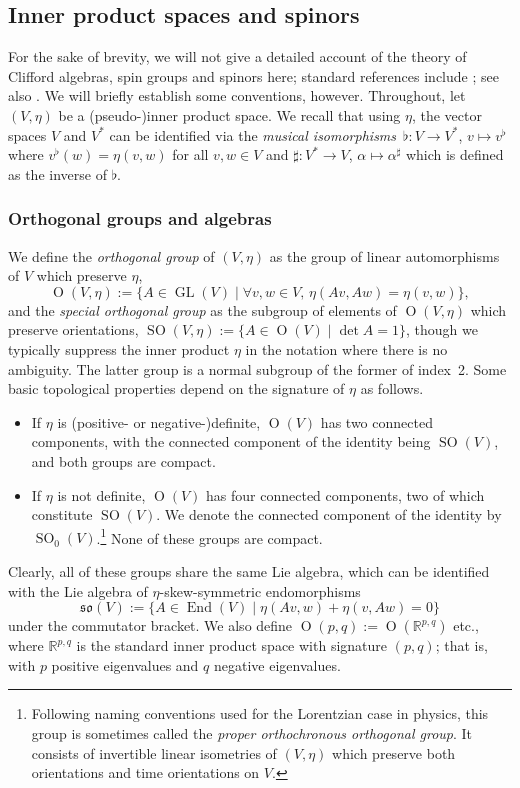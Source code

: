 \documentclass[pdftex]{sigma}
\numberwithin{equation}{section}
\newcommand{\fso}{\mathfrak{so}}
\newcommand{\RR}{\mathbb{R}}
\newcommand{\1}{\mathbbm{1}}
\DeclareMathOperator{\End}{End}
\DeclareMathOperator{\GL}{GL}
\DeclareMathOperator{\Orth}{O}
\DeclareMathOperator{\SO}{SO}
\begin{document}
\subsection{Inner product spaces and spinors}
\label{sec:inner-products-spinors}

For the sake of brevity, we will not give a detailed account of the theory of Clifford algebras, spin groups and spinors here; standard references include \cite{Harvey1990,Lawson1989}; see also \cite{JMF-spin}. We will briefly establish some conventions, however. Throughout, let $(V,\eta)$ be a (pseudo-)inner product space.
We recall that using $\eta$, the vector spaces $V$ and $V^*$ can be identified via the \emph{musical isomorphisms}~${\flat\colon V\to V^*}$, $v\mapsto v^\flat$ where
$v^\flat(w) = \eta(v,w)
$
for all $v,w\in V$ and $\sharp\colon V^*\to V$, $\alpha\mapsto\alpha^\sharp$ which is defined as the inverse of $\flat$.

\subsubsection{Orthogonal groups and algebras}
\label{sec:orth-groups-algs}

We define the \emph{orthogonal group} of $(V,\eta)$ as the group of linear automorphisms of $V$ which preserve $\eta$,
\[
	\Orth(V,\eta) := \{A\in\GL(V) \mid \forall v,w\in V,\, \eta(Av,Aw) = \eta(v,w)\},
\]
and the \emph{special orthogonal group} as the subgroup of elements of $\Orth(V,\eta)$ which preserve orientations,
$\SO(V,\eta) := \{A\in \Orth(V) \mid \det A = 1\}$,
though we typically suppress the inner product $\eta$ in the notation where there is no ambiguity. The latter group is a normal subgroup of the former of index~2. Some basic topological properties depend on the signature of $\eta$ as follows.
\begin{itemize}\itemsep=0pt
	\item If $\eta$ is (positive- or negative-)definite, $\Orth(V)$ has two connected components, with the connected component of the identity being $\SO(V)$, and both groups are compact.
	\item If $\eta$ is not definite, $\Orth(V)$ has four connected components, two of which constitute $\SO(V)$. We denote the connected component of the identity by $\SO_0(V)$.\footnote{Following naming conventions used for the Lorentzian case in physics, this group is sometimes called the \emph{proper orthochronous orthogonal group}. It consists of invertible linear isometries of $(V,\eta)$ which preserve both orientations and time orientations on $V$.} None of these groups are compact.
\end{itemize}
Clearly, all of these groups share the same Lie algebra, which can be identified with the Lie algebra of $\eta$-skew-symmetric endomorphisms
\[
	\fso(V) := \{A\in\End(V) \mid \eta(Av,w) + \eta(v,Aw) = 0\}
\]
under the commutator bracket. We also define $\Orth(p,q):=\Orth(\RR^{p,q})$ etc., where $\RR^{p,q}$ is the standard inner product space with signature $(p,q)$; that is, with $p$ positive eigenvalues and $q$ negative eigenvalues.
\end{document}
